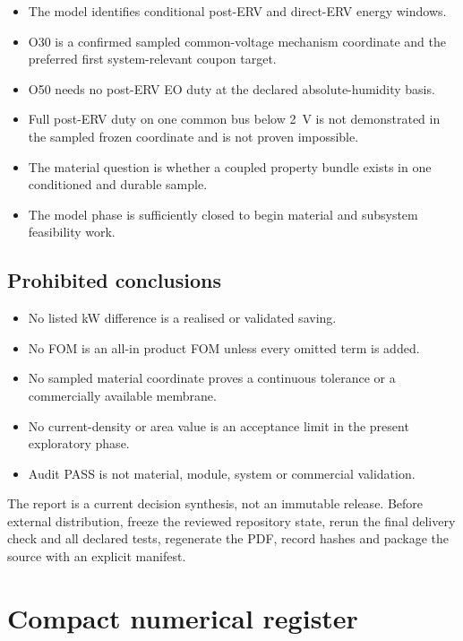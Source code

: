\documentclass[10pt,a4paper]{article}
\begin{document}
\begin{itemize}
  \item The model identifies conditional post-ERV and direct-ERV energy windows.
  \item O30 is a confirmed sampled common-voltage mechanism coordinate and the
        preferred first system-relevant coupon target.
  \item O50 needs no post-ERV EO duty at the declared absolute-humidity basis.
  \item Full post-ERV duty on one common bus below 2~V is not demonstrated in
        the sampled frozen coordinate and is not proven impossible.
  \item The material question is whether a coupled property bundle exists in
        one conditioned and durable sample.
  \item The model phase is sufficiently closed to begin material and subsystem
        feasibility work.
\end{itemize}

\subsection{Prohibited conclusions}

\begin{itemize}
  \item No listed kW difference is a realised or validated saving.
  \item No FOM is an all-in product FOM unless every omitted term is added.
  \item No sampled material coordinate proves a continuous tolerance or a
        commercially available membrane.
  \item No current-density or area value is an acceptance limit in the present
        exploratory phase.
  \item Audit PASS is not material, module, system or commercial validation.
\end{itemize}

\begin{stopbox}
The report is a current decision synthesis, not an immutable release. Before
external distribution, freeze the reviewed repository state, rerun the final
delivery check and all declared tests, regenerate the PDF, record hashes and
package the source with an explicit manifest.
\end{stopbox}

\appendix
\section{Compact numerical register}
\end{document}
